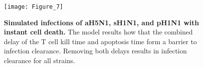 \documentclass[10pt]{article}
\begin{document}
\begin{figure}[!ht]
\begin{center}
\texttt{[image: Figure\_7]}
 \end{center}
\caption{{\bf Simulated infections of aH5N1, sH1N1, and pH1N1 with instant cell death.} The model results how that the combined delay of the T cell kill time and apoptosis time form a barrier to infection clearance.  Removing both delays results in infection clearance for all strains.}
 \label{fig:instantkill}
\end{figure}

%
%
%
%
%
%
\end{document}
